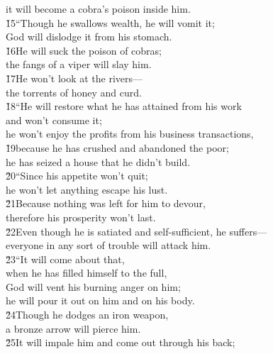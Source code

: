 \begin{poetry}
\poemll    it will become a cobra's poison inside him. \\
\poeml \v{15}``Though he swallows wealth, he will vomit it; \\
\poemll    God will dislodge it from his stomach. \\
\poeml \v{16}He will suck the poison of cobras; \\
\poemll    the fangs of a viper will slay him. \\
\poeml \v{17}He won't look at the rivers--- \\
\poemll    the torrents of honey and curd. \\
\poeml \v{18}``He will restore what he has attained from his work \\
\poemll    and won't consume it; \\
\poemlll       he won't enjoy the profits from his business transactions, \\
\poeml \v{19}because he has crushed and abandoned the poor; \\
\poemll    he has seized a house that he didn't build. \\
\poeml \v{20}``Since his appetite won't quit; \\
\poemll    he won't let anything escape his lust. \\
\poeml \v{21}Because nothing was left for him to devour, \\
\poemll    therefore his prosperity won't last. \\
\poeml \v{22}Even though he is satiated and self-sufficient, he suffers--- \\
\poemll    everyone in any sort of trouble will attack him. \\
\poeml \v{23}``It will come about that, \\
\poemll    when he has filled himself to the full, \\
\poeml God will vent his burning anger on him; \\
\poemll    he will pour it out on him and on his body. \\
\poeml \v{24}Though he dodges an iron weapon, \\
\poemll    a bronze arrow will pierce him. \\
\poeml \v{25}It will impale him and come out through his back; \\

\end{poetry}
